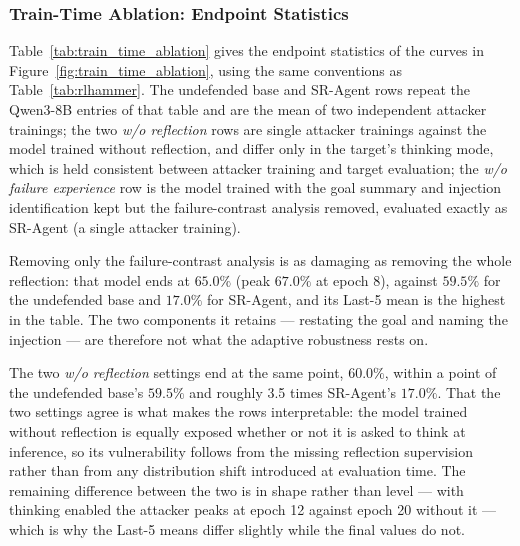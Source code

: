 
\subsubsection{Train-Time Ablation: Endpoint Statistics}
\label{app:train_time_ablation}

Table~\ref{tab:train_time_ablation} gives the endpoint statistics of the curves in
Figure~\ref{fig:train_time_ablation}, using the same conventions as Table~\ref{tab:rlhammer}. The undefended base and
SR-Agent rows repeat the Qwen3-8B entries of that table and are the mean of two independent attacker trainings; the two
\emph{w/o reflection} rows are single attacker trainings against the model trained without reflection, and differ only in the
target's thinking mode, which is held consistent between attacker training and target evaluation; the \emph{w/o failure
experience} row is the model trained with the goal summary and injection identification kept but the failure-contrast
analysis removed, evaluated exactly as SR-Agent (a single attacker training).

Removing only the failure-contrast analysis is as damaging as removing the whole reflection: that model ends at $65.0\%$
(peak $67.0\%$ at epoch 8), against $59.5\%$ for the undefended base and $17.0\%$ for SR-Agent, and its
Last-5 mean is the highest in the table. The two components it retains --- restating the goal and naming the injection ---
are therefore not what the adaptive robustness rests on.

The two \emph{w/o reflection} settings end at the same point, $60.0\%$, within a point of the undefended base's
$59.5\%$ and roughly 3.5 times SR-Agent's $17.0\%$. That the two settings agree is what makes the
rows interpretable: the model trained without reflection is equally exposed whether or not it is asked to think at
inference, so its vulnerability follows from the missing reflection supervision rather than from any distribution
shift introduced at evaluation time. The remaining difference between the two is in shape rather than level ---
with thinking enabled the attacker peaks at epoch 12 against epoch 20 without it --- which is why the
Last-5 means differ slightly while the final values do not.

